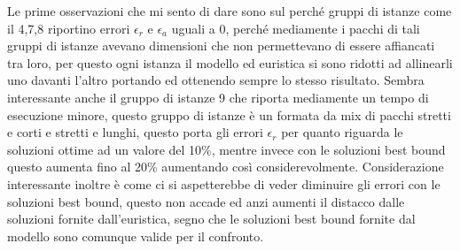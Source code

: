 Le prime osservazioni che mi sento di dare sono sul perché gruppi di istanze come il 4,7,8 riportino errori $\epsilon_r$ e $\epsilon_a$ uguali a 0, perché mediamente i pacchi di tali gruppi di istanze avevano dimensioni che non permettevano di essere affiancati tra loro, per questo ogni istanza il modello ed euristica si sono ridotti ad allinearli uno davanti l'altro portando ed ottenendo sempre lo stesso risultato. Sembra interessante anche il gruppo di istanze 9 che riporta mediamente un tempo di esecuzione minore, questo gruppo di istanze è un formata da mix di pacchi stretti e corti e stretti e lunghi, questo porta gli errori $\epsilon_r$ per quanto riguarda le soluzioni ottime ad un valore del 10\%, mentre invece con le soluzioni best bound questo aumenta fino al 20\% aumentando così considerevolmente.
Considerazione interessante inoltre è come ci si aspetterebbe di veder diminuire gli errori con le soluzioni best bound, questo non accade ed anzi aumenti il distacco dalle soluzioni fornite dall'euristica, segno che le soluzioni best bound fornite dal modello sono comunque valide per il confronto.

\newpage
